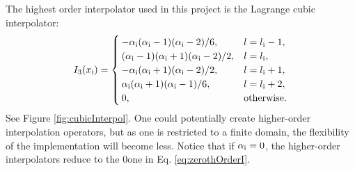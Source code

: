 The highest order interpolator used in this project is the Lagrange cubic interpolator: 
\begin{equation}\label{eq:cubicI}
    I_3(x_{\text{i}}) = \begin{cases}
        -\alpha_{\text{i}} (\alpha_{\text{i}}-1)(\alpha_{\text{i}}-2)/6, & l = l_{\text{i}}-1,\\
        (\alpha_{\text{i}}-1)(\alpha_{\text{i}}+1)(\alpha_{\text{i}}-2)/2,  & l = l_{\text{i}},\\
        -\alpha_{\text{i}} (\alpha_{\text{i}}+1)(\alpha_{\text{i}}-2)/2, & l = l_{\text{i}} + 1,\\
        \alpha_{\text{i}} (\alpha_{\text{i}}+1)(\alpha_{\text{i}}-1)/6, & l = l_{\text{i}} + 2,\\
        0, & \text{otherwise.}
    \end{cases}
\end{equation}
See Figure \ref{fig:cubicInterpol}. One could potentially create higher-order interpolation operators, but as one is restricted to a finite domain, the flexibility of the implementation will become less. Notice that if $\alpha_{\text{i}} = 0$, the higher-order interpolators reduce to the $0$\thOrder one in Eq. \eqref{eq:zerothOrderI}.

